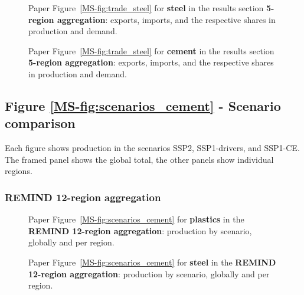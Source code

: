 \begin{figure}[htbp]
    \centering
    \caption{Paper Figure~\ref{MS-fig:trade_steel} for \textbf{steel} in the results section \textbf{5-region aggregation}: exports, imports, and the respective shares in production and demand.}
    \label{fig:figure_10_steel_agg5}
\end{figure}

\begin{figure}[htbp]
    \centering
    \caption{Paper Figure~\ref{MS-fig:trade_steel} for \textbf{cement} in the results section \textbf{5-region aggregation}: exports, imports, and the respective shares in production and demand.}
    \label{fig:figure_10_cement_agg5}
\end{figure}

\clearpage
\subsection{Figure \texorpdfstring{\ref{MS-fig:scenarios_cement}}{8} - Scenario comparison} \label{sec:add_fig_11}

Each figure shows production in the scenarios SSP2, SSP1-drivers, and SSP1-CE.
The framed panel shows the global total, the other panels show individual regions.

\subsubsection{REMIND 12-region aggregation}

\begin{figure}[htbp]
    \centering
    \caption{Paper Figure~\ref{MS-fig:scenarios_cement} for \textbf{plastics} in the \textbf{REMIND 12-region aggregation}: production by scenario, globally and per region.}
    \label{fig:figure_11_plastics_h12}
\end{figure}

\begin{figure}[htbp]
    \centering
    \caption{Paper Figure~\ref{MS-fig:scenarios_cement} for \textbf{steel} in the \textbf{REMIND 12-region aggregation}: production by scenario, globally and per region.}
    \label{fig:figure_11_steel_h12}
\end{figure}

